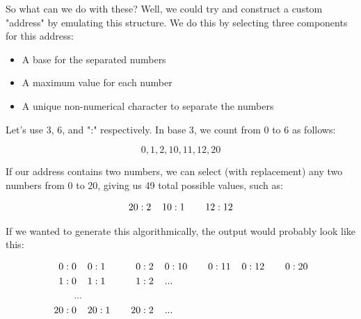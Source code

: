 \documentclass{article}
\begin{document}
\noindent So what can we do with these? Well, we could try and construct a custom "address" by emulating this structure. We do this by selecting three components for this address:

\begin{itemize}
\item A base for the separated numbers
\item A maximum value for each number
\item A unique non-numerical character to separate the numbers
\end{itemize}

\noindent Let's use 3, 6, and ":" respectively. In base 3, we count from 0 to 6 as follows:

$$0, 1, 2, 10, 11, 12, 20$$

\noindent If our address contains two numbers, we can select (with replacement) any two numbers from 0 to 20, giving us 49 total possible values, such as:

\begin{align*}
20:2 \hspace{2mm}&\hspace{2mm} 10:1 \hspace{2mm}&\hspace{2mm} 12:12
\end{align*}

\noindent If we wanted to generate this algorithmically, the output would probably look like this:

\begin{align*}
0:0 \hspace{2mm}&\hspace{2mm} 0:1 \hspace{2mm}&\hspace{2mm} 0:2 \hspace{2mm}&\hspace{2mm} 0:10 \hspace{2mm}&\hspace{2mm} 0:11 \hspace{2mm}&\hspace{2mm} 0:12 \hspace{2mm}&\hspace{2mm} 0:20\\
1:0 \hspace{2mm}&\hspace{2mm} 1:1 \hspace{2mm}&\hspace{2mm} 1:2 \hspace{2mm}&\hspace{2mm} ...&&&\\
...\\
20:0 \hspace{2mm}&\hspace{2mm} 20:1 \hspace{2mm}&\hspace{2mm} 20:2 \hspace{2mm}&\hspace{2mm}...&&&
\end{align*}
\end{document}

